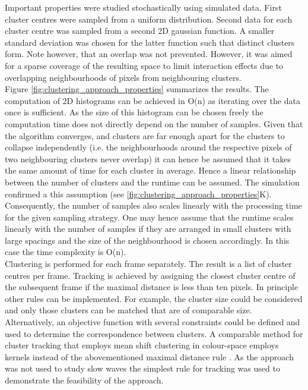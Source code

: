Important properties were studied stochastically using simulated data. First cluster centres were sampled from a uniform distribution. Second data for each cluster centre was sampled from a second 2D gaussian function. A smaller standard deviation was chosen for the latter function such that distinct clusters form. Note however, that an overlap was not prevented. However, it was aimed for a sparse coverage of the resulting space to limit interaction effects due to overlapping neighbourhoods of pixels from neighbouring clusters.\\
Figure \ref{fig:clustering_approach_properties} summarizes the results. The computation of 2D histograms can be achieved in O(n) as iterating over the data once is sufficient. As the size of this histogram can be chosen freely the computation time does not directly depend on the number of samples. Given that the algorithm converges, and clusters are far enough apart for the clusters to collapse independently (i.e. the neighbourhoods around the respective pixels of two neighbouring clusters never overlap) it can hence be assumed that it takes the same amount of time for each cluster in average. Hence a linear relationship between the number of clusters and the runtime can be assumed. The simulation confirmed a this assumption (see \ref{fig:clustering_approach_properties}K). Consequently, the number of samples also scales linearly with the processing time for the given sampling strategy. One may hence assume that the runtime scales linearly with the number of samples if they are arranged in small clusters with large spacings and the size of the neighbourhood is chosen accordingly. In this case the time complexity is O(n).\\
Clustering is performed for each frame separately. The result is a list of cluster centres per frame. Tracking is achieved by assigning the closest cluster centre of the subsequent frame if the maximal distance is less than ten pixels. In principle other rules can be implemented. For example, the cluster size could be considered and only those clusters can be matched that are of comparable size. Alternatively, an objective function with several constraints could be defined and used to determine the correspondence between clusters. A comparable method for cluster tracking that employs mean shift clustering in colour-space employs kernels instead of the abovementioned maximal distance rule \parencite{kumar2020tracking}. As the approach was not used to study slow waves the simplest rule for tracking was used to demonstrate the feasibility of the approach.\\
